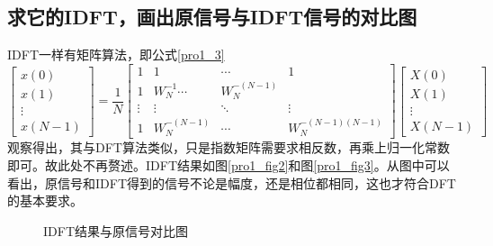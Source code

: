 \documentclass[UTF8]{article}
\begin{document}
\begin{CJK}{UTF8}{gkai}
\subsection{求它的IDFT，画出原信号与IDFT信号的对比图}
IDFT一样有矩阵算法，即公式\ref{pro1_3}
\begin{equation}
\left[\begin{array}{c}
x(0)\\
x(1)\\
\vdots\\
x(N-1)
\end{array}\right]
=
\frac{1}{N}
\left[\begin{array}{cccc}
1 & 1 & \cdots & 1\\
1 & W_N^{-1} \cdots & W_N^{-(N-1)}\\
\vdots&\vdots&\ddots&\vdots\\
1 & W_N^{-(N-1)} & \cdots & W_N^{-(N-1)(N-1)}
\end{array}
\right]
\left[
\begin{array}{c}
  X(0)\\
  X(1)\\
  \vdots\\
  X(N-1)
\end{array}
\right]\label{pro1_3}
\end{equation}
观察得出，其与DFT算法类似，只是指数矩阵需要求相反数，再乘上归一化常数即可。故此处不再赘述。IDFT结果如图\ref{pro1_fig2}和图\ref{pro1_fig3}。从图中可以看出，原信号和IDFT得到的信号不论是幅度，还是相位都相同，这也才符合DFT的基本要求。
\begin{figure}[H]
  \centering
  \caption{IDFT结果与原信号对比图}
  \label{pro1_fig23}
\end{figure}


\end{CJK}
\end{document}
